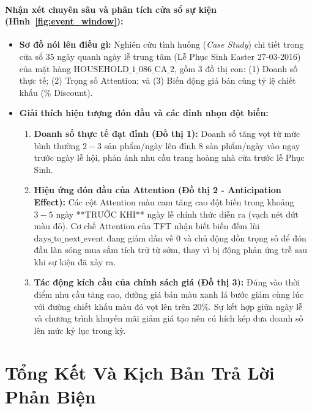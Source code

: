 \documentclass[12pt,a4paper,oneside]{article}
\begin{document}
\paragraph{Nhận xét chuyên sâu và phân tích cửa sổ sự kiện (Hình~\ref{fig:event_window}):}
\begin{itemize}
    \item \textbf{Sơ đồ nói lên điều gì:} Nghiên cứu tình huống (\textit{Case Study}) chi tiết trong cửa sổ 35 ngày quanh ngày lễ trung tâm (Lễ Phục Sinh Easter 27-03-2016) của mặt hàng $\mathrm{HOUSEHOLD\_1\_086\_CA\_2}$, gồm 3 đồ thị con: (1) Doanh số thực tế; (2) Trọng số Attention; và (3) Biến động giá bán cùng tỷ lệ chiết khấu (\% Discount).
    \item \textbf{Giải thích hiện tượng đón đầu và các đỉnh nhọn đột biến:}
    \begin{enumerate}
        \item \textbf{Doanh số thực tế đạt đỉnh (Đồ thị 1):} Doanh số tăng vọt từ mức bình thường $2 - 3$ sản phẩm/ngày lên đỉnh $8$ sản phẩm/ngày vào ngay trước ngày lễ hội, phản ánh nhu cầu trang hoàng nhà cửa trước lễ Phục Sinh.
        \item \textbf{Hiệu ứng đón đầu của Attention (Đồ thị 2 - Anticipation Effect):} Các cột Attention màu cam tăng cao đột biến trong khoảng $3 - 5$ ngày **TRƯỚC KHI** ngày lễ chính thức diễn ra (vạch nét đứt màu đỏ). Cơ chế Attention của TFT nhận biết biến đếm lùi $\mathrm{days\_to\_next\_event}$ đang giảm dần về 0 và chủ động dồn trọng số để đón đầu làn sóng mua sắm tích trữ từ sớm, thay vì bị động phản ứng trễ sau khi sự kiện đã xảy ra.
        \item \textbf{Tác động kích cầu của chính sách giá (Đồ thị 3):} Đúng vào thời điểm nhu cầu tăng cao, đường giá bán màu xanh lá bước giảm cùng lúc với đường chiết khấu màu đỏ vọt lên trên $20\%$. Sự kết hợp giữa ngày lễ và chương trình khuyến mãi giảm giá tạo nên cú hích kép đưa doanh số lên mức kỷ lục trong kỳ.
    \end{enumerate}
\end{itemize}

\section{Tổng Kết Và Kịch Bản Trả Lời Phản Biện}
\end{document}
